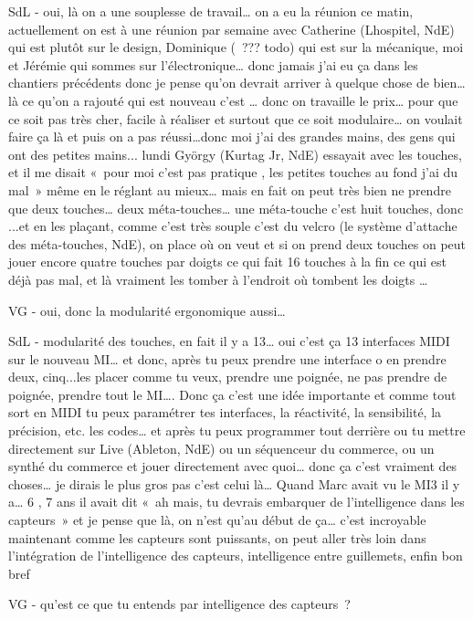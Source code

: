 SdL - oui, là on a une souplesse de travail… on a eu la réunion ce matin, actuellement on est à une réunion par semaine avec Catherine (Lhospitel, NdE) qui est plutôt sur le design, Dominique ( ??? todo) qui est sur la mécanique, moi et Jérémie qui sommes sur l'électronique… donc jamais j'ai eu ça dans les chantiers précédents donc je pense qu'on devrait arriver à quelque chose de bien… là ce qu'on a rajouté qui est nouveau c'est … donc on travaille le prix… pour que ce soit pas très cher, facile à réaliser et surtout que ce soit modulaire… on voulait faire ça là et puis on a pas réussi…donc moi j'ai des grandes mains, des gens qui ont des petites mains... lundi György (Kurtag Jr, NdE) essayait avec les touches, et il me disait « pour moi c'est pas pratique , les petites touches au fond j'ai du mal » même en le réglant au mieux… mais en fait on peut très bien ne prendre que deux touches… deux méta-touches… une méta-touche c'est huit touches, donc ...et en les plaçant, comme c'est très souple c'est du velcro (le système d'attache des méta-touches, NdE), on place où on veut et si on prend deux touches on peut jouer encore quatre touches par doigts ce qui fait 16 touches à la fin ce qui est déjà pas mal, et là vraiment les tomber à l'endroit où tombent les doigts … 

VG - oui, donc la modularité ergonomique aussi… 

SdL - modularité des touches, en fait il y a 13… oui c'est ça 13 interfaces MIDI sur le nouveau MI… et donc, après tu peux prendre une interface o en prendre deux, cinq...les placer comme tu veux, prendre une poignée, ne pas prendre de poignée, prendre tout le MI…. Donc ça c'est une idée importante et comme tout sort en MIDI tu peux paramétrer tes interfaces, la réactivité, la sensibilité, la précision, etc. les codes… et après tu peux programmer tout derrière ou tu mettre directement sur Live (Ableton, NdE) ou un séquenceur du commerce, ou un synthé du commerce et jouer directement avec quoi… donc ça c'est vraiment des choses… je dirais le plus gros pas c'est celui là… Quand Marc avait vu le MI3 il y a… 6 , 7 ans il avait dit « ah mais, tu devrais embarquer de l'intelligence dans les capteurs » et je pense que là, on n'est qu'au début de ça… c'est incroyable maintenant comme les capteurs sont puissants, on peut aller très loin dans l'intégration de l'intelligence des capteurs, intelligence entre guillemets, enfin bon bref 

VG - qu'est ce que tu entends par intelligence des capteurs ? 


